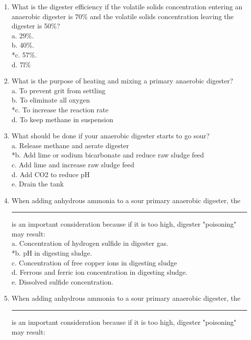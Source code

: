 \documentclass{article}
\begin{document}
\begin{enumerate}
\item  What is the digester efficiency if the volatile solids concentration entering an anaerobic digester is 70\% and the volatile solids concentration leaving the digester is 50\%? \\

a. 29\%. \\
b. 40\%. \\
*c. 57\%. \\
d. 7l\% \\

\item  What is the purpose of heating and mixing a primary anaerobic digester? \\

a. To prevent grit from settling \\
b. To eliminate all oxygen \\
*c. To increase the reaction rate \\
d. To keep methane in suspension \\

\item  What should be done if your anaerobic digester starts to go sour? \\

a. Release methane and aerate digester \\
*b. Add lime or sodium bicarbonate and reduce raw sludge feed \\
c. Add lime and increase raw sludge feed \\
d. Add CO2 to reduce pH \\
e. Drain the tank \\

\item  When adding anhydrous ammonia to a sour primary anaerobic digester, the \rule{1.5cm}{0.3mm} is an important consideration because if it is too high, digester "poisoning" may result: \\

a. Concentration of hydrogen sulfide in digester gas. \\
*b. pH in digesting sludge. \\
c. Concentration of free copper ions in digesting sludge \\
d. Ferrous and ferric ion concentration in digesting sludge. \\
e. Dissolved sulfide concentration. \\

\item  When adding anhydrous ammonia to a sour primary anaerobic digester, the \rule{1.5cm}{0.3mm} is an important consideration because if it is too high, digester "poisoning" may result: \\


\end{enumerate}
\end{document}
